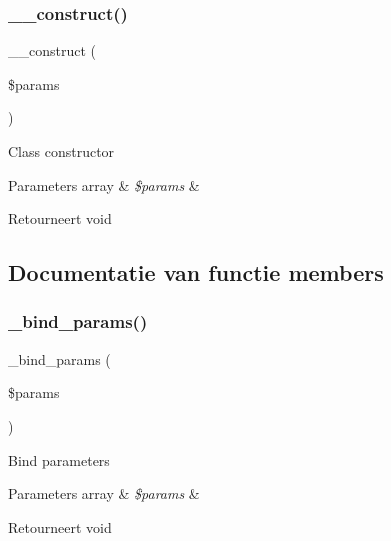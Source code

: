 \subsubsection{\texorpdfstring{\_\_construct()}{\_\_construct()}}
{\footnotesize\ttfamily \+\_\+\+\_\+construct (\begin{DoxyParamCaption}\item[{}]{\$params }\end{DoxyParamCaption})}

Class constructor


\begin{DoxyParams}[1]{Parameters}
array & {\em \$params} & \\
\hline
\end{DoxyParams}
\begin{DoxyReturn}{Retourneert}
void 
\end{DoxyReturn}


\subsection{Documentatie van functie members}
\mbox{\label{class_c_i___d_b__oci8__driver_a66b8b06dadf7ff16c3877d5c024f5d2b}} 
\subsubsection{\texorpdfstring{\_bind\_params()}{\_bind\_params()}}
{\footnotesize\ttfamily \+\_\+bind\+\_\+params (\begin{DoxyParamCaption}\item[{}]{\$params }\end{DoxyParamCaption})\hspace{0.3cm}{\ttfamily [protected]}}

Bind parameters


\begin{DoxyParams}[1]{Parameters}
array & {\em \$params} & \\
\hline
\end{DoxyParams}
\begin{DoxyReturn}{Retourneert}
void 
\end{DoxyReturn}
\mbox{\label{class_c_i___d_b__oci8__driver_a4d9082658000e5ede8312067c6dda9db}} 

